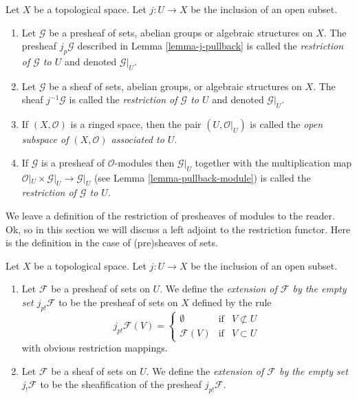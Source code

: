 \begin{definition}
\label{definition-restriction}
Let $X$ be a topological space.
Let $j : U \to X$ be the inclusion of an open subset.
\begin{enumerate}
\item Let $\mathcal{G}$ be a presheaf of sets, abelian groups or
algebraic structures on $X$. The presheaf $j_p\mathcal{G}$ described
in Lemma \ref{lemma-j-pullback} is called
the {\it restriction of $\mathcal{G}$ to $U$} and denoted $\mathcal{G}|_U$.
\item Let $\mathcal{G}$ be a sheaf of sets, abelian groups, or
algebraic structures on $X$. The sheaf $j^{-1}\mathcal{G}$ is called
the {\it restriction of $\mathcal{G}$ to $U$} and denoted $\mathcal{G}|_U$.
\item If $(X, \mathcal{O})$ is a ringed space, then the pair
$(U, \mathcal{O}|_U)$ is called the
{\it open subspace of $(X, \mathcal{O})$ associated to $U$}.
\item If $\mathcal{G}$ is a presheaf of $\mathcal{O}$-modules
then $\mathcal{G}|_U$ together with the multiplication map
$\mathcal{O}|_U \times \mathcal{G}|_U \to \mathcal{G}|_U$
(see Lemma \ref{lemma-pullback-module})
is called the {\it restriction of $\mathcal{G}$ to $U$}.
\end{enumerate}
\end{definition}

\noindent
We leave a definition of the restriction of presheaves
of modules to the reader. Ok, so in this section we will
discuss a left adjoint to the restriction functor.
Here is the definition in the case of (pre)sheaves
of sets.

\begin{definition}
\label{definition-j-shriek}
Let $X$ be a topological space.
Let $j : U \to X$ be the inclusion of an open subset.
\begin{enumerate}
\item Let $\mathcal{F}$ be a presheaf of sets on $U$. We define
the {\it extension of $\mathcal{F}$ by the empty set $j_{p!}\mathcal{F}$}
to be the presheaf of sets on $X$ defined by the rule
$$
j_{p!}\mathcal{F}(V) =
\left\{
\begin{matrix}
\emptyset & \text{if} & V \not \subset U \\
\mathcal{F}(V) & \text{if} & V \subset U
\end{matrix}
\right.
$$
with obvious restriction mappings.
\item Let $\mathcal{F}$ be a sheaf of sets on $U$. We define
the {\it extension of $\mathcal{F}$ by the empty set $j_!\mathcal{F}$}
to be the sheafification of the presheaf $j_{p!}\mathcal{F}$.
\end{enumerate}
\end{definition}

